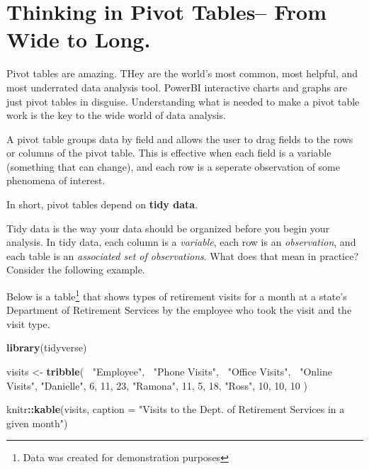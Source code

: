 \documentclass[]{book}
\newenvironment{Shaded}{\begin{snugshade}}{\end{snugshade}}
\newcommand{\KeywordTok}[1]{\textcolor[rgb]{0.13,0.29,0.53}{\textbf{#1}}}
\newcommand{\DataTypeTok}[1]{\textcolor[rgb]{0.13,0.29,0.53}{#1}}
\newcommand{\DecValTok}[1]{\textcolor[rgb]{0.00,0.00,0.81}{#1}}
\newcommand{\StringTok}[1]{\textcolor[rgb]{0.31,0.60,0.02}{#1}}
\newcommand{\OperatorTok}[1]{\textcolor[rgb]{0.81,0.36,0.00}{\textbf{#1}}}
\newcommand{\NormalTok}[1]{#1}
\begin{document}
\section{Thinking in Pivot Tables-- From Wide to
Long.}\label{thinking-in-pivot-tables-from-wide-to-long.}

Pivot tables are amazing. THey are the world's most common, most
helpful, and most underrated data analysis tool. PowerBI interactive
charts and graphs are just pivot tables in disguise. Understanding what
is needed to make a pivot table work is the key to the wide world of
data analysis.

A pivot table groups data by field and allows the user to drag fields to
the rows or columns of the pivot table. This is effective when each
field is a variable (something that can change), and each row is a
seperate observation of some phenomena of interest.

In short, pivot tables depend on \textbf{tidy data}.

Tidy data is the way your data should be organized before you begin your
analysis. In tidy data, each column is a \emph{variable}, each row is an
\emph{observation}, and each table is an \emph{associated set of
observations}. What does that mean in practice? Consider the following
example.

Below is a table\footnote{Data was created for demonstration purposes}
that shows types of retirement visits for a month at a state's
Department of Retirement Services by the employee who took the visit and
the visit type.

\begin{Shaded}
\begin{Highlighting}[]
\KeywordTok{library}\NormalTok{(tidyverse)}

\NormalTok{visits <-}\StringTok{ }\KeywordTok{tribble}\NormalTok{(}
  \OperatorTok{~}\StringTok{"Employee"}\NormalTok{, }\OperatorTok{~}\StringTok{"Phone Visits"}\NormalTok{, }\OperatorTok{~}\StringTok{"Office Visits"}\NormalTok{, }\OperatorTok{~}\StringTok{"Online Visits"}\NormalTok{,}
  \StringTok{"Danielle"}\NormalTok{, }\DecValTok{6}\NormalTok{, }\DecValTok{11}\NormalTok{, }\DecValTok{23}\NormalTok{,}
  \StringTok{"Ramona"}\NormalTok{, }\DecValTok{11}\NormalTok{, }\DecValTok{5}\NormalTok{, }\DecValTok{18}\NormalTok{,}
  \StringTok{"Ross"}\NormalTok{, }\DecValTok{10}\NormalTok{, }\DecValTok{10}\NormalTok{, }\DecValTok{10} 
\NormalTok{)}

\NormalTok{knitr}\OperatorTok{::}\KeywordTok{kable}\NormalTok{(visits, }\DataTypeTok{caption =} \StringTok{"Visits to the Dept. of Retirement Services in a given month"}\NormalTok{)}
\end{Highlighting}
\end{Shaded}
\end{document}
